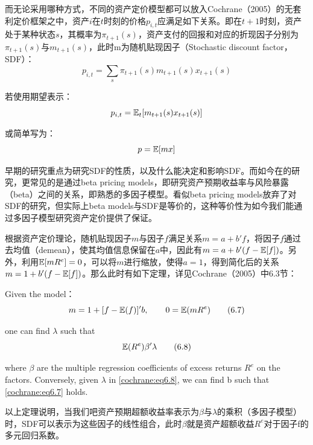 \documentclass[11pt]{article}
\begin{document}
而无论采用哪种方式，不同的资产定价模型都可以放入Cochrane（2005）的无套利定价框架之中，资产$i$在$t$时刻的价格$p_{i,t}$应满足如下关系。即在$t+1$时刻，资产处于某种状态$s$，其概率为$\pi_{t+1}(s)$，资产支付的回报和对应的折现因子分别为$\pi_{t+1}(s)$与$m_{t+1}(s)$，此时m为随机贴现因子（Stochastic discount factor，SDF）：
\begin{equation*}
    p_{i,t} = \sum_s \pi_{t+1}(s) m_{t+1}(s) x_{t+1}(s)
\end{equation*}

若使用期望表示：
\begin{equation*}
    p_{i,t} = \mathbb{E}_t[m_{t+1}(s) x_{t+1}(s)]
\end{equation*}

或简单写为：
\begin{equation*}
    p = \mathbb{E}[mx]
\end{equation*}

早期的研究重点为研究SDF的性质，以及什么能决定和影响SDF。而如今在的研究，更常见的是通过beta pricing models，即研究资产预期收益率与风险暴露（beta）之间的关系，即熟悉的多因子模型。看似beta pricing models放弃了对SDF的研究，但实际上beta models与SDF是等价的，这种等价性为如今我们能通过多因子模型研究资产定价提供了保证。

根据资产定价理论，随机贴现因子$m$与因子$f$满足关系$m=a+b'f$，将因子$f$通过去均值（demean），使其均值信息保留在$a$中，因此有$m=a+b'(f-\mathbb{E}[f])$。另外，利用$\mathbb{E}[mR^e]=0$，可以将$m$进行缩放，使得$a=1$，得到简化后的关系$m=1+b'(f-\mathbb{E}[f])$。那么此时有如下定理，详见Cochrane（2005）中6.3节：
\begin{thm}
    Given the model：
    \begin{equation}
        m = 1 + [f-\mathbb{E}(f)]'b, \qquad 0=\mathbb{E}(mR^e)
        \tag{6.7}
        \label{cochrane:eq6.7}
    \end{equation}

    one can find $\lambda$ such that
    \begin{equation}
        \mathbb{E}(R^e) \beta' \lambda
        \tag{6.8}
        \label{cochrane:eq6.8}
    \end{equation}

    where $\beta$ are the multiple regression coefficients of excess returns $R^e$ on the factors. Conversely, given $\lambda$ in \ref{cochrane:eq6.8}, we can find b such that \ref{cochrane:eq6.7} holds.
\end{thm}

以上定理说明，当我们吧资产预期超额收益率表示为$\beta$与$\lambda$的乘积（多因子模型）时，SDF可以表示为这些因子的线性组合，此时$\beta$就是资产超额收益$R^e$对于因子f的多元回归系数。
\end{document}
